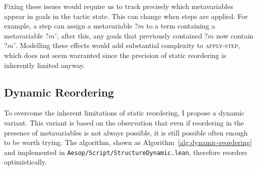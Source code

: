 \documentclass[sigplan,10pt,anonymous,review]{acmart}
\newcommand{\mvar}[1]{{?#1}}
\begin{document}
Fixing these issues would require us to track precisely which metavariables appear in goals in the tactic state.
This can change when steps are applied.
For example, a step can assign a metavariable $\mvar{m}$ to a term containing a metavariable $\mvar{m'}$; after this, any goals that previously contained $\mvar{m}$ now contain $\mvar{m'}$.
Modelling these effects would add substantial complexity to \textsc{apply-step}, which does not seem warranted since the precision of static reordering is inherently limited anyway.

\subsection{Dynamic Reordering}%
\label{sec:dynamic-reordering}

To overcome the inherent limitations of static reordering, I propose a dynamic variant.
This variant is based on the observation that even if reordering in the presence of metavariables is not always possible, it is still possible often enough to be worth trying.
The algorithm, shown as Algorithm~\ref{alg:dynamic-reordering} and implemented in \texttt{Aesop/Script/StructureDynamic.lean}, therefore reorders optimistically.
\end{document}
